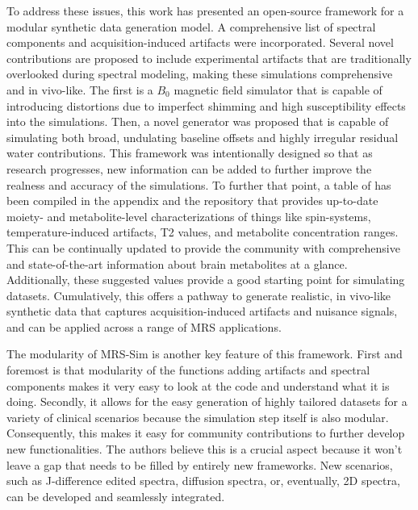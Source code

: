  
To address these issues, this work has presented an open-source framework for a modular synthetic data generation model. %
A comprehensive list of spectral components and acquisition-induced artifacts were incorporated. 
Several novel contributions are proposed to include experimental artifacts that are traditionally overlooked during spectral modeling, making these simulations comprehensive and in vivo-like. The first is a $B_0$ magnetic field simulator that is capable of introducing distortions due to imperfect shimming and high susceptibility effects into the simulations. Then, a novel generator was proposed that is capable of simulating both broad, undulating baseline offsets and highly irregular residual water contributions. This framework was intentionally designed so that as research progresses, new information can be added to further improve the realness and accuracy of the simulations. To further that point, a table of has been compiled in the appendix and the repository that provides up-to-date moiety- and metabolite-level characterizations of things like spin-systems, temperature-induced artifacts, T2 values, and metabolite concentration ranges. This can be continually updated to provide the community with comprehensive and state-of-the-art information about brain metabolites at a glance. Additionally, these suggested values provide a good starting point for simulating datasets. Cumulatively, this offers a pathway to generate realistic, in vivo-like synthetic data that captures acquisition-induced artifacts and nuisance signals, and can be applied across a range of MRS applications. 

The modularity of MRS-Sim is another key feature of this framework. First and foremost is that modularity of the functions adding artifacts and spectral components makes it very easy to look at the code and understand what it is doing. Secondly, it allows for the easy generation of highly tailored datasets for a variety of clinical scenarios because the simulation step itself is also modular. Consequently, this makes it easy for community contributions to further develop new functionalities. The authors believe this is a crucial aspect %
because it won't leave a gap that needs to be filled by entirely new frameworks. New scenarios, such as J-difference edited spectra, diffusion spectra, or, eventually, 2D spectra, can be developed and seamlessly integrated.
 
